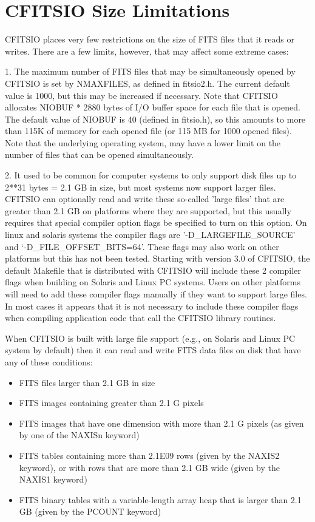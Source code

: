\documentclass[11pt]{book}
\begin{document}
\section{CFITSIO Size Limitations}

CFITSIO places very few restrictions on the size of FITS files that it
reads or writes.  There are a few limits, however, that may affect
some extreme cases:

1.  The maximum number of FITS files that may be simultaneously opened by
CFITSIO is set by NMAXFILES, as defined in fitsio2.h.  The current default
value is 1000, but this may be increased if necessary. Note that CFITSIO
allocates NIOBUF * 2880 bytes of I/O buffer space for each file that is
opened.  The default value of NIOBUF is 40 (defined in fitsio.h), so this
amounts to  more than 115K of memory  for each opened file (or 115 MB for
1000 opened files).  Note that the underlying  operating system, may have a
lower limit on the number of files that can be opened simultaneously.

2.  It used to be common for computer systems to only support disk files up
to 2**31 bytes = 2.1 GB in size, but most systems now support larger files.
CFITSIO can optionally read and write these so-called 'large files' that
are greater than 2.1 GB on
platforms where they are supported, but this
usually requires that special compiler option flags be specified to turn
on this  option.  On linux and solaris systems the compiler flags are
'-D\_LARGEFILE\_SOURCE' and  `-D\_FILE\_OFFSET\_BITS=64'. These flags
may also work on other platforms but this has not been tested.  Starting
with version 3.0 of CFITSIO, the default Makefile that is distributed
with CFITSIO will include these 2 compiler flags when building on Solaris
and Linux PC systems.   Users on other platforms will need to add these
compiler flags manually if they want to support large files.  In most
cases it appears that it is not necessary to include these compiler
flags when compiling application code that call the CFITSIO library
routines.

When CFITSIO is built with large file support (e.g., on Solaris and
Linux PC system by default) then it can read and write FITS data files
on disk that have any of these conditions:

\begin{itemize}
\item
FITS files larger than 2.1 GB in size
\item
FITS images containing greater than 2.1 G pixels
\item
FITS images that have one dimension with more than 2.1 G pixels
(as given by one of the NAXISn keyword)
\item
FITS tables containing more than 2.1E09 rows (given by the NAXIS2 keyword),
or with rows that are more than 2.1 GB wide (given by the NAXIS1 keyword)
\item
FITS binary tables with a variable-length array heap that is larger
than 2.1 GB (given by the PCOUNT keyword)
\end{itemize}
\end{document}
